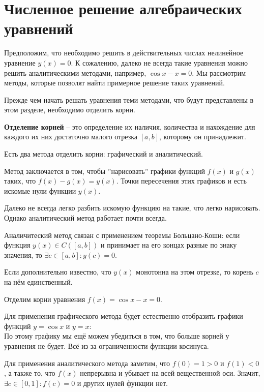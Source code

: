 \documentclass[../main.tex]{subfile}
\begin{document}
\section{Численное решение алгебраических уравнений}

Предположим, что необходимо решить в действительных числах нелинейное уравнение
$y(x)=0$. К сожалению, далеко не всегда такие уравнения можно решить
аналитическими методами, например, $\cos x-x=0$. Мы рассмотрим методы, которые
позволят найти примерное решение таких уравнений.

Прежде чем начать решать уравнения теми методами, что будут представлены в этом
разделе, необходимо отделить корни. 

\begin{define}
	\textbf{Отделение корней} -- это определение их наличия, количества и
	нахождение для каждого их них достаточно малого отрезка $[a,b]$,
	которому он принадлежит.
\end{define}

Есть два метода отделить корни: графический и аналитический.

\begin{algorithm}
	Метод заключается в том, чтобы ''нарисовать'' графики функций $f(x)$ и
	$g(x)$ таких, что $f(x)-g(x)=y(x)$. Точки пересечения этих графиков и
	есть искомые нули функции $y(x)$.
\end{algorithm}

Далеко не всегда легко разбить искомую функцию на такие, что легко нарисовать.
Однако аналитический метод работает почти всегда.

\begin{algorithm}
	Аналичитеский метод связан с применением теоремы Больцано-Коши: если
	функция $y(x)\in C([a,b])$ и принимает на его концах разные по знаку
	значения, то $\exists c\in[a,b]: y(c)=0$.

	Если дополнительно известно, что $y(x)$ монотонна на этом отрезке,
	то корень $c$ на нём единственный.
\end{algorithm}

\begin{example}
	Отделим корни уравнения $f(x)=\cos x-x=0$.

	Для применения графического метода будет естественно отобразить графики
	функций $y=\cos x$ и $y=x$: \\

	

	По этому графику мы ещё можем убедиться в том, что больше корней у
	уравнения не будет. Всё из-за ограниченности функции косинуса.

	Для применения аналитического метода заметим, что $f(0)=1>0$ и $f(1)<0$,
	а также то, что $f(x)$ непрерывна и убывает на всей вещественной оси.
	Значит, $\exists c\in[0,1]: f(c)=0$ и других нулей функции нет.
\end{example}
\end{document}
